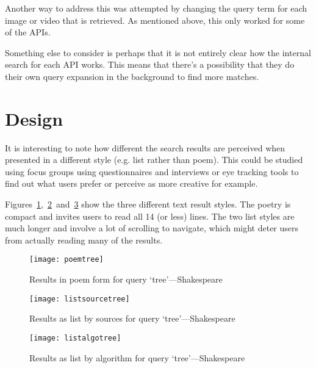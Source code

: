 Another way to address this was attempted by changing the query term for each image or video that is retrieved. As mentioned above, this only worked for some of the \ac{API}s.

\spirals

Something else to consider is perhaps that it is not entirely clear how the internal search for each \ac{API} works. This means that there's a possibility that they do their own query expansion in the background to find more matches.



\section{Design}

It is interesting to note how different the search results are perceived when presented in a different style (e.g. list rather than poem). This could be studied using focus groups using questionnaires and interviews or eye tracking tools to find out what users prefer or perceive as more creative for example. 

Figures~\ref{fig:poemtree},~\ref{fig:listsourcetree}~and~\ref{fig:listalgotree} show the three different text result styles. The poetry is compact and invites users to read all 14 (or less) lines. The two list styles are much longer and involve a lot of scrolling to navigate, which might deter users from actually reading many of the results.

\begin{figure}[!htbp]
\centering
  \texttt{[image: poemtree]}
\caption[Results as poem]{Results in poem form for query `tree'---Shakespeare}
\label{fig:poemtree}
\end{figure}

\begin{figure}[!htbp]
\centering
  \texttt{[image: listsourcetree]}
\caption[Results as list by sources]{Results as list by sources for query `tree'---Shakespeare}
\label{fig:listsourcetree}
\end{figure}

\begin{figure}[!htbp]
\centering
  \texttt{[image: listalgotree]}
\caption[Results as list by algorithm]{Results as list by algorithm for query `tree'---Shakespeare}
\label{fig:listalgotree}
\end{figure}


